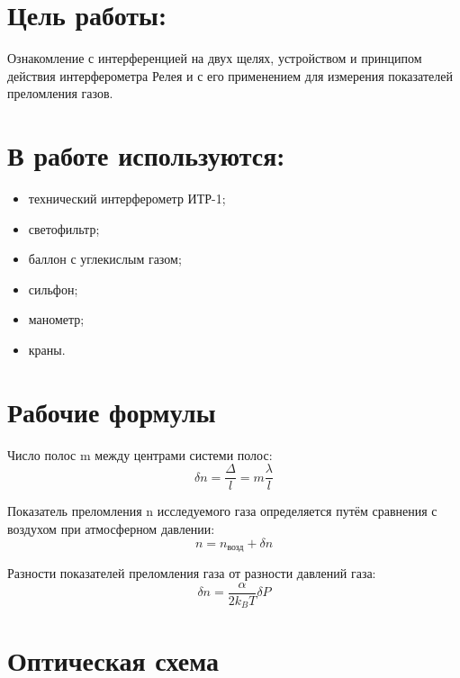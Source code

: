 \documentclass[a4paper, 12pt]{article}
\begin{document}
\section*{Цель работы:}

\noindent Ознакомление с интерференцией на двух щелях, устройством и принципом действия интерферометра Релея и с его применением для измерения показателей преломления газов.

\section*{В работе используются: }
\begin{itemize}
\item технический интерферометр ИТР-1; 
\item светофильтр; 
\item баллон с углекислым газом; 
\item сильфон;
\item манометр;
\item краны.
\end{itemize}	

\section{Рабочие формулы}  




\noindent Число полос m между центрами системи полос:
\begin{equation}
\delta n = \frac{\Delta}{l}=m \frac{\lambda}{l}
\end{equation}


\noindent Показатель преломления n исследуемого газа определяется путём сравнения с воздухом при атмосферном давлении:
\begin{equation}
n = n_{\text{возд}}+\delta n
\end{equation}


\noindent Разности показателей преломления газа от разности давлений газа:
\begin{equation}
\delta n = \frac{\alpha}{2k_BT}\delta P
\end{equation}


\section{Оптическая схема}
\end{document}
